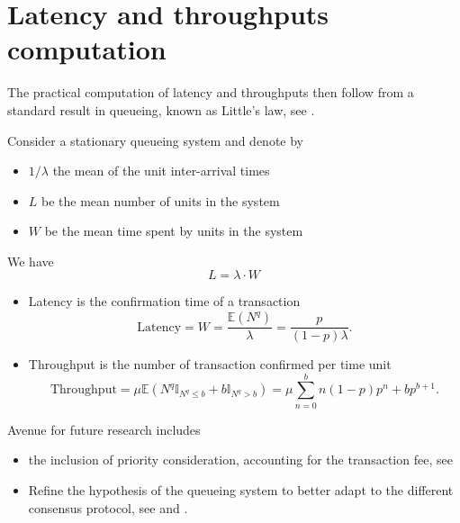 \section{Latency and throughputs computation}\label{sec:latency_throughputs}
The practical computation of latency and throughputs then follow from a standard result in queueing, known as Little's law, see \citet{Little1961}.
\begin{theo}
Consider a stationary queueing system and denote by 
\begin{itemize}
  \item $1/\lambda$ the mean of the unit inter-arrival times
  \item $L$ be the mean number of units in the system
  \item $W$ be the mean time spent by units in the system
\end{itemize}
We have
$$
L = \lambda \cdot W
$$
\end{theo}
\begin{itemize}
  \item Latency is the confirmation time of a transaction 
    $$
    \text{Latency} = W  = \frac{\mathbb{E}(N^q)}{\lambda} =  \frac{p}{(1-p)\lambda} .
    $$
  \item Throughput is the number of transaction confirmed per time unit
  $$
    \text{Throughput} = \mu\mathbb{E}(N^q\mathbb{I}_{N^q\leq b}+b\mathbb{I}_{N^q> b}) = \mu\sum_{n = 0}^bn(1-p)p^n + bp^{b+1}.
  $$
\end{itemize}
Avenue for future research includes 
\begin{itemize}
	\item the inclusion of priority consideration, accounting for the transaction fee, see \citet{Kawase2020}
	\item Refine the hypothesis of the queueing system to better adapt to the different consensus protocol, see \citet{Li2018} and \citet{Li2019}.
\end{itemize}
\newpage